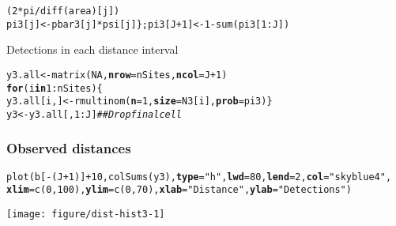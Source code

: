 \documentclass[color=usenames,dvipsnames]{beamer}\usepackage[]{graphicx}\usepackage[]{xcolor}
\makeatletter
\newcommand{\hlnum}[1]{\textcolor[rgb]{0.69,0.494,0}{#1}}%
\newcommand{\hlsng}[1]{\textcolor[rgb]{0.749,0.012,0.012}{#1}}%
\newcommand{\hlcom}[1]{\textcolor[rgb]{0.514,0.506,0.514}{\textit{#1}}}%
\newcommand{\hlopt}[1]{\textcolor[rgb]{0,0,0}{#1}}%
\newcommand{\hldef}[1]{\textcolor[rgb]{0,0,0}{#1}}%
\newcommand{\hlkwa}[1]{\textcolor[rgb]{0,0,0}{\textbf{#1}}}%
\newcommand{\hlkwb}[1]{\textcolor[rgb]{0,0.341,0.682}{#1}}%
\newcommand{\hlkwc}[1]{\textcolor[rgb]{0,0,0}{\textbf{#1}}}%
\newcommand{\hlkwd}[1]{\textcolor[rgb]{0.004,0.004,0.506}{#1}}%
\newenvironment{kframe}{%
 \def\at@end@of@kframe{}%
 \ifinner\ifhmode%
  \def\at@end@of@kframe{\end{minipage}}%
  \begin{minipage}{\columnwidth}%
 \fi\fi%
 \def\FrameCommand##1{\hskip\@totalleftmargin \hskip-\fboxsep
 \colorbox{shadecolor}{##1}\hskip-\fboxsep
     \hskip-\linewidth \hskip-\@totalleftmargin \hskip\columnwidth}%
 \MakeFramed {\advance\hsize-\width
   \@totalleftmargin\z@ \linewidth\hsize
   \@setminipage}}%
 {\par\unskip\endMakeFramed%
 \at@end@of@kframe}
\newenvironment{knitrout}{}{} %
\makeatother
\begin{document}
\begin{frame}[fragile]
\begin{knitrout}
\begin{kframe}
\begin{alltt}
                          \hldef{(}\hlnum{2}\hlopt{*}\hldef{pi}\hlopt{/}\hlkwd{diff}\hldef{(area)[j])}
    \hldef{pi3[j]} \hlkwb{<-} \hldef{pbar3[j]}\hlopt{*}\hldef{psi[j] \}; pi3[J}\hlopt{+}\hlnum{1}\hldef{]} \hlkwb{<-} \hlnum{1}\hlopt{-}\hlkwd{sum}\hldef{(pi3[}\hlnum{1}\hlopt{:}\hldef{J])}
\end{alltt}
\end{kframe}
\end{knitrout}
  \pause
  \vfill
  Detections in each distance interval
  \vspace{-6pt}
\begin{knitrout}\scriptsize
{}\color{fgcolor}\begin{kframe}
\begin{alltt}
\hldef{y3.all} \hlkwb{<-} \hlkwd{matrix}\hldef{(}\hlnum{NA}\hldef{,} \hlkwc{nrow}\hldef{=nSites,} \hlkwc{ncol}\hldef{=J}\hlopt{+}\hlnum{1}\hldef{)}
\hlkwa{for}\hldef{(i} \hlkwa{in} \hlnum{1}\hlopt{:}\hldef{nSites) \{}
    \hldef{y3.all[i,]} \hlkwb{<-} \hlkwd{rmultinom}\hldef{(}\hlkwc{n}\hldef{=}\hlnum{1}\hldef{,} \hlkwc{size}\hldef{=N3[i],} \hlkwc{prob}\hldef{=pi3)    \}}
\hldef{y3} \hlkwb{<-} \hldef{y3.all[,}\hlnum{1}\hlopt{:}\hldef{J]}  \hlcom{## Drop final cell}
\end{alltt}
\end{kframe}
\end{knitrout}
\end{frame}



\begin{frame}[fragile]
  \frametitle{Observed distances}
  \centering
\begin{knitrout}\scriptsize
{}\color{fgcolor}\begin{kframe}
\begin{alltt}
\hlkwd{plot}\hldef{(b[}\hlopt{-}\hldef{(J}\hlopt{+}\hlnum{1}\hldef{)]}\hlopt{+}\hlnum{10}\hldef{,} \hlkwd{colSums}\hldef{(y3),} \hlkwc{type}\hldef{=}\hlsng{"h"}\hldef{,} \hlkwc{lwd}\hldef{=}\hlnum{80}\hldef{,} \hlkwc{lend}\hldef{=}\hlnum{2}\hldef{,} \hlkwc{col}\hldef{=}\hlsng{"skyblue4"}\hldef{,}
     \hlkwc{xlim}\hldef{=}\hlkwd{c}\hldef{(}\hlnum{0}\hldef{,}\hlnum{100}\hldef{),} \hlkwc{ylim}\hldef{=}\hlkwd{c}\hldef{(}\hlnum{0}\hldef{,} \hlnum{70}\hldef{),} \hlkwc{xlab}\hldef{=}\hlsng{"Distance"}\hldef{,} \hlkwc{ylab}\hldef{=}\hlsng{"Detections"}\hldef{)}
\end{alltt}
\end{kframe}
\texttt{[image: figure/dist-hist3-1]} 
\end{knitrout}
\end{frame}
\end{document}
